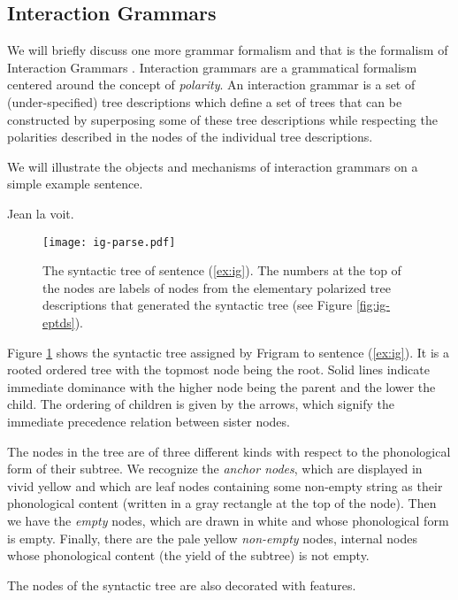 \subsection{Interaction Grammars}

We will briefly discuss one more grammar formalism and that is the
formalism of Interaction Grammars \cite{guillaume2009interaction}.
Interaction grammars are a grammatical formalism centered around the
concept of \emph{polarity}. An interaction grammar is a set of
(under-specified) tree descriptions which define a set of trees that can
be constructed by superposing some of these tree descriptions while
respecting the polarities described in the nodes of the individual tree
descriptions.

We will illustrate the objects and mechanisms of interaction grammars on
a simple example sentence.

\begin{exe}
  \ex \label{ex:ig} Jean la voit.
\end{exe}

\begin{figure}
  \centering
  \texttt{[image: ig-parse.pdf]}
  \caption{\label{fig:ig-parse} The syntactic tree of sentence
    (\ref{ex:ig}). The numbers at the top of the nodes are labels of
    nodes from the elementary polarized tree descriptions that generated
    the syntactic tree (see Figure \ref{fig:ig-eptds}).}
\end{figure}

Figure \ref{fig:ig-parse} shows the syntactic tree assigned by Frigram
to sentence (\ref{ex:ig}). It is a rooted ordered tree with the topmost
node being the root. Solid lines indicate immediate dominance with the
higher node being the parent and the lower the child. The ordering of
children is given by the arrows, which signify the immediate precedence
relation between sister nodes.

The nodes in the tree are of three different kinds with respect to the
phonological form of their subtree. We recognize the \emph{anchor
  nodes}, which are displayed in vivid yellow and which are leaf nodes
containing some non-empty string as their phonological content (written
in a gray rectangle at the top of the node). Then we have the
\emph{empty} nodes, which are drawn in white and whose phonological form
is empty. Finally, there are the pale yellow \emph{non-empty} nodes,
internal nodes whose phonological content (the yield of the subtree) is
not empty.

The nodes of the syntactic tree are also decorated with features.

